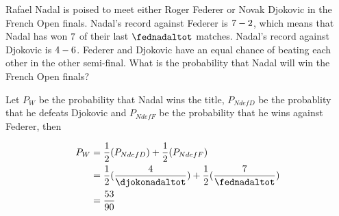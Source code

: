 

\question[3] Rafael Nadal is poised to meet either Roger Federer or Novak 
Djokovic in the French Open finals. Nadal's record against Federer is 
$7-2$, which means that Nadal has won $7$ of their last $\fednadaltot$ matches. Nadal's 
record against Djokovic is $4-6$. Federer and Djokovic have an equal chance of
beating each other in the other semi-final. What is the probability that Nadal will win 
the French Open finals? 


\ifprintanswers
\fi 

\begin{solution}[\halfpage]
  Let $P_{W}$ be the probability that Nadal wins the title, 
$P_{NdefD}$ be the probablity that he defeats Djokovic and $P_{NdefF}$  
be the probability that he wins against Federer, then 
   
  \begin{align}
    P_{W} &= \dfrac{1}{2}(P_{NdefD}) + \dfrac{1}{2}(P_{NdefF}) \\
   	  &= \dfrac{1}{2}(\dfrac{\vbtwo}{\djokonadaltot}) + \dfrac{1}{2}(\dfrac{\vbone}{\fednadaltot}) \\ 
   	  &= \dfrac{\vbthree}{\vbfour}
  \end{align}
\end{solution}
